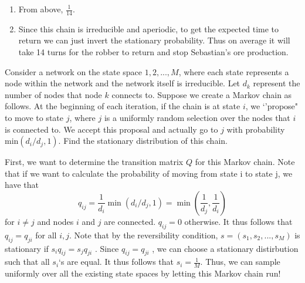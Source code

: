 \documentclass[11pt]{article}
\begin{document}
{\begin{solution}
\begin{enumerate}
\item From above, $\frac{1}{14}$.

\item Since this chain is irreducible and aperiodic, to get the expected time to return we can just invert the stationary probability. Thus on average it will take 14 turns for the robber to return and stop Sebastian's ore production.

\end{enumerate}
\end{solution}

\begin{exercise}
 Consider a network on the state space $1,2,...,M$, where each state represents a node within the network and the network itself is irreducible. Let $d_k$ represent the number of nodes that node $k$ connects to. Suppose we create a Markov chain as follows. At the beginning of each iteration, if the chain is at state $i$, we `'propose" to move to state $j$, where $j$ is a uniformly random selection over the nodes that $i$ is connected to. We accept this proposal and actually go to $j$ with probability min$(d_i/d_j,1)$. Find the stationary distribution of this chain.
\end{exercise}

\begin{solution}
First, we want to determine the transition matrix $Q$ for this Markov chain. Note that if we want to calculate
the probability of moving from state i to state j, we have that
$$
q_{ij} = \frac{1}{d_i}\min(d_i/d_j, 1) = \min(\frac{1}{d_j}, \frac{1}{d_i})
$$
for $i \neq j$ and nodes $i$ and $j$ are connected. $q_{ij} = 0$ otherwise.
It thus follows that $q_{ij} = q_{ji}$ for all $i, j$. Note that by the reversibility condition, $s = (s_1 , s_2 , ..., s_M )$ is stationary if $s_iq_{ij} = s_jq_{ji}$ . Since $q_{ij} = q_{ji}$ , we can choose a stationary distirbution such that all $s_i$`s are equal. It thus follows that $s_i = \frac{1}{M}$.
Thus, we can sample uniformly over all the existing state spaces by letting this Markov chain run!
\end{solution}


}
\end{document}
